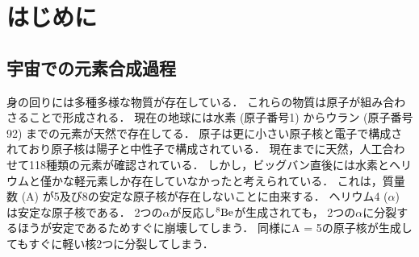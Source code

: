 \documentclass[../master]{subfiles}
\begin{document}
\chapter{はじめに}
\section{宇宙での元素合成過程}
\label{seq::nucleaosynthesis}
身の回りには多種多様な物質が存在している．
これらの物質は原子が組み合わさることで形成される．
現在の地球には水素 (原子番号1) からウラン (原子番号92) までの元素が天然で存在してる．
原子は更に小さい原子核と電子で構成されており原子核は陽子と中性子で構成されている．
現在までに天然，人工合わせて118種類の元素が確認されている．
しかし，ビッグバン直後には水素とヘリウムと僅かな軽元素しか存在していなかったと考えられている．
これは，質量数 (A) が5及び8の安定な原子核が存在しないことに由来する．
ヘリウム4 ($\alpha$) は安定な原子核である．
2つの$\alpha$が反応し${}^{8}{\rm Be}$が生成されても，
2つの$\alpha$に分裂するほうが安定であるためすぐに崩壊してしまう．
同様にA = 5の原子核が生成してもすぐに軽い核2つに分裂してしまう．
\end{document}
